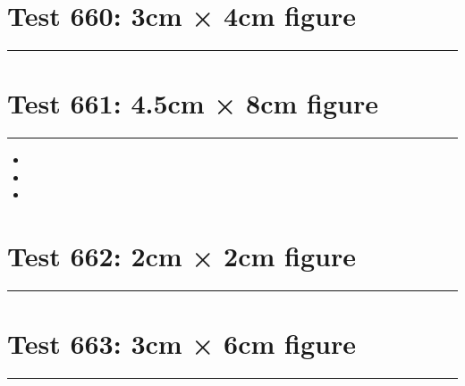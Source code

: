 \documentclass[a4paper,11pt]{article}
\begin{document}
\section*{Test 660: 3cm × 4cm figure}
\begin{swarmwrap}%
  \begin{minipage}[t]{3cm}
    \centering
    \rule{\linewidth}{4cm}
  \end{minipage}%
\end{swarmwrap}%
\swarmwrapnext
\lipsum[41]
\lipsum[42]
\lipsum[43]
\lipsum[44]
\lipsum[45]
\lipsum[46]
\section*{Test 661: 4.5cm × 8cm figure}
\begin{swarmwrap}%
  \begin{minipage}[t]{4cm}
    \centering
    \rule{\linewidth}{8cm}
  \end{minipage}%
\end{swarmwrap}
\begin{itemize}
  \item \swarmwrapnext\lipsum[93][1-4]
  \item \lipsum[95][1-3]
  \item \lipsum[96][1-3]
\end{itemize}
\section*{Test 662: 2cm × 2cm figure}
\begin{swarmwrap}%
  \begin{minipage}[t]{2cm}
    \centering
    \rule{\linewidth}{2cm}
  \end{minipage}%
\end{swarmwrap}%
\swarmwrapnext
\lipsum[115]
\lipsum[116]
\lipsum[117]
\lipsum[118]
\lipsum[119]
\section*{Test 663: 3cm × 6cm figure}
\begin{swarmwrap}%
  \begin{minipage}[t]{3cm}
    \centering
    \rule{\linewidth}{6cm}
  \end{minipage}%
\end{swarmwrap}%
\swarmwrapnext
\lipsum[35]
\lipsum[36]
\lipsum[37]
\end{document}
